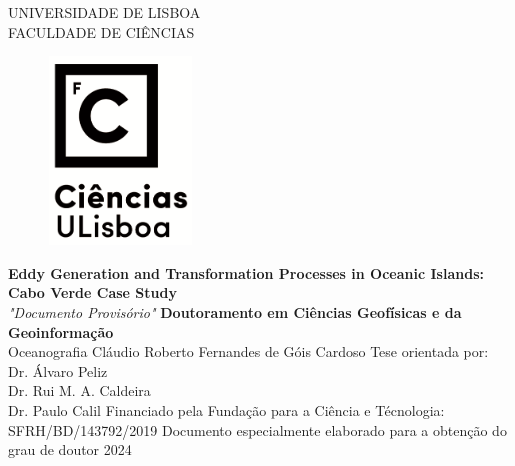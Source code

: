 \begin{titlepage}
	\centering
	UNIVERSIDADE DE LISBOA\\
	FACULDADE DE CIÊNCIAS\\
	\vfill
	\begin{figure}[h]
		\centering
		\includegraphics[width = 3.84cm,height = 5.00cm]{images/logo_vertical.png}
	\end{figure}
	
	\vfill
	\fontsize{12.2}{14.4}\selectfont \textbf{Eddy Generation and Transformation Processes in Oceanic Islands: Cabo Verde Case Study}\\
	\vfill
	\textit{"Documento Provisório"}
	\vfill
	\textbf{Doutoramento em Ciências Geofísicas e da Geoinformação}\\
	Oceanografia
	\vfill
	Cláudio Roberto Fernandes de Góis Cardoso
	\vfill
	\fontsize{12}{14.4}\selectfont Tese orientada por:\\
	Dr. Álvaro Peliz\\
	Dr. Rui M. A. Caldeira \\
	Dr. Paulo Calil
	\vfill
	Financiado pela Fundação para a Ciência e Técnologia: SFRH/BD/143792/2019
	\vfill
	Documento especialmente elaborado para a obtenção do grau de doutor
	\vfill
	\fontsize{14}{12}2024\\
\end{titlepage}